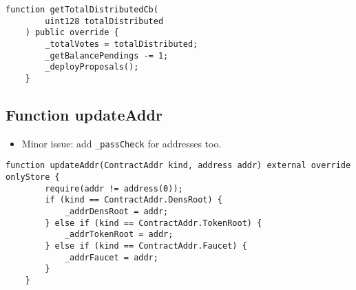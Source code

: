 \begin{lstlisting}[firstnumber=148]
    function getTotalDistributedCb(
        uint128 totalDistributed
    ) public override {
        _totalVotes = totalDistributed;
        _getBalancePendings -= 1;
        _deployProposals();
    }
\end{lstlisting}

\subsection{Function updateAddr}

\begin{itemize}
\item Minor issue: add {\tt \_passCheck} for addresses too.
\end{itemize}

\begin{lstlisting}[firstnumber=174]
    function updateAddr(ContractAddr kind, address addr) external override onlyStore {
        require(addr != address(0));
        if (kind == ContractAddr.DensRoot) {
            _addrDensRoot = addr;
        } else if (kind == ContractAddr.TokenRoot) {
            _addrTokenRoot = addr;
        } else if (kind == ContractAddr.Faucet) {
            _addrFaucet = addr;
        }
    }
\end{lstlisting}

